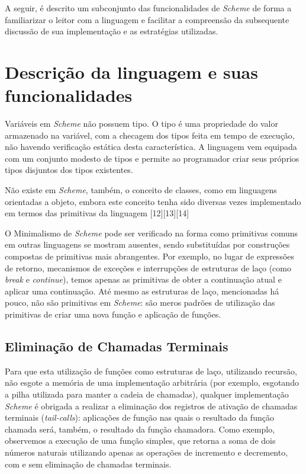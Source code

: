 A seguir, é descrito um subconjunto das funcionalidades de \textit{Scheme} de forma a
familiarizar o leitor com a linguagem e facilitar a compreensão da subsequente
discussão de sua implementação e as estratégias utilizadas.

\section{Descrição da linguagem e suas funcionalidades}
\label{sec:funcionalidades}

Variáveis em \textit{Scheme} não possuem tipo. O tipo é uma propriedade do
valor armazenado na variável, com a checagem dos tipos feita em tempo de
execução, não havendo verificação estática desta característica. A linguagem
vem equipada com um conjunto modesto de tipos e permite ao programador criar
seus próprios tipos disjuntos dos tipos existentes.

Não existe em \textit{Scheme}, também, o conceito de classes, como em
linguagens orientadas a objeto, embora este conceito tenha sido diversas vezes
implementado em termos das primitivas da linguagem [12][13][14]

O Minimalismo de \textit{Scheme} pode ser verificado na forma como primitivas
comuns em outras linguagens se mostram ausentes, sendo substituídas por
construções compostas de primitivas mais abrangentes. Por exemplo, no lugar de
expressões de retorno, mecanismos de exceções e interrupções de estruturas de
laço (como \textit{break} e \textit{continue}), temos apenas as primitivas de
obter a continuação atual e aplicar uma continuação. Até mesmo as estruturas de
laço, mencionadas há pouco, não são primitivas em \textit{Scheme}: são meros
padrões de utilização das primitivas de criar uma nova função e aplicação de
funções.


\subsection{Eliminação de Chamadas Terminais}

Para que esta utilização de funções como estruturas de laço, utilizando
recursão, não esgote a memória de uma implementação arbitrária (por exemplo,
esgotando a pilha utilizada para manter a cadeia de chamadas), qualquer
implementação \textit{Scheme} é obrigada a realizar a eliminação dos registros
de ativação de chamadas terminais (\textit{tail-calls}): aplicações de função
nas quais o resultado da função chamada será, também, o resultado da função
chamadora. Como exemplo, observemos a execução de uma função simples, que
retorna a soma de dois números naturais utilizando apenas as operações de
incremento e decremento, com e sem eliminação de chamadas terminais.

